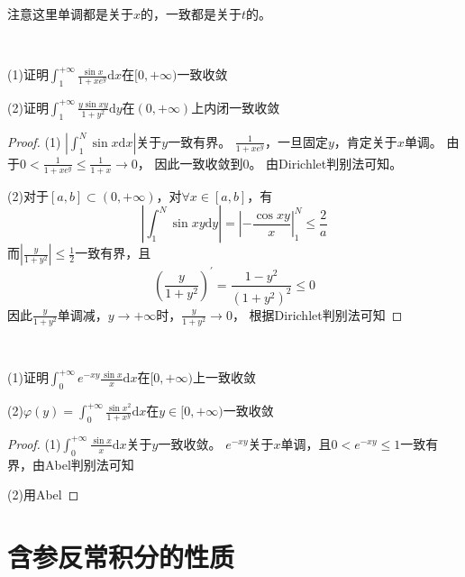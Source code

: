 \begin{note}
  注意这里单调都是关于$x$的，一致都是关于$t$的。
\end{note}

~

\begin{exercise}[Dirichlet判别法]
  (1)证明$\int_1^{+\infty}\frac{\sin x}{1 + xe^y} \mathrm{d}x$在$[0,+\infty)$一致收敛

  (2)证明$\int_1^{+\infty} \frac{y \sin xy}{1 + y^2}\mathrm{d} y$在$(0,+\infty)$上内闭一致收敛
\end{exercise}

\begin{proof}
  (1)
  $\left|\int_1^N\sin x \mathrm{d}x\right|$关于$y$一致有界。
  $\frac{1}{1 + xe^y}$，一旦固定$y$，肯定关于$x$单调。
  由于$0 < \frac{1}{1 + xe^y} \leq \frac{1}{1 + x} \rightarrow 0$，
  因此一致收敛到$0$。
  由Dirichlet判别法可知。

  (2)对于$[a,b] \subset (0,+\infty)$，对$\forall x \in [a,b]$，有
  \begin{equation*}
    \left| \int_1^N \sin xy \mathrm{d} y \right| = \left| - \frac{\cos xy}{x} \right|^N_1 \leq \frac{2}{a}
  \end{equation*}
  而$\left| \frac{y}{1 + y^2} \right| \leq \frac{1}{2}$一致有界，且
  \begin{equation*}
    \left( \frac{y}{1+y^2} \right)^{\prime} = \frac{1-y^2}{(1+y^2)^2} \leq 0
  \end{equation*}
  因此$\frac{y}{1+y^2}$单调减，$y \rightarrow +\infty$时，$\frac{y}{1+y^2} \rightarrow 0$，
  根据Dirichlet判别法可知
\end{proof}

~

\begin{exercise}[Abel判别法]
  (1)证明$\int_0^{+\infty}e^{-xy} \frac{\sin x}{x} \mathrm{d}x$在$[0,+\infty)$上一致收敛

  (2)$\varphi(y) = \int_0^{+\infty} \frac{\sin x^2}{1 + x^y}\mathrm{d}x$在$y \in [0,+\infty)$一致收敛
\end{exercise}

\begin{proof}
  (1)$\int_0^{+\infty} \frac{\sin x}{x} \mathrm{d}x$关于$y$一致收敛。
  $e^{-xy}$关于$x$单调，且$0 < e^{-xy} \leq 1$一致有界，由Abel判别法可知

  (2)用Abel
\end{proof}

\section{含参反常积分的性质}


